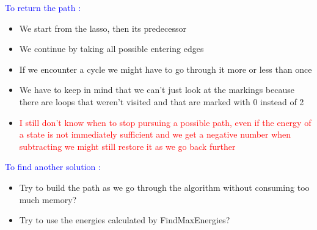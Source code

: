 \documentclass{rapport}
\begin{document}
\vspace{12pt}

\textcolor{blue}{To return the path :}\\
\begin{itemize}
    \item We start from the lasso, then its predecessor
    \item We continue by taking all possible entering edges
    \item If we encounter a cycle we might have to go through it more or less than once
    \item We have to keep in mind that we can't just look at the markings because there are loops that weren't visited and that are marked with 0 instead of 2
    \item \textcolor{red}{I still don’t know when to stop pursuing a possible path, even if the energy of a state is not immediately sufficient and we get a negative number when subtracting we might still restore it as we go back further}
\end{itemize}

\vspace{12pt}

\textcolor{blue}{To find another solution :}\\
\begin{itemize}
    \item Try to build the path as we go through the algorithm without consuming too much memory?
    \item Try to use the energies calculated by FindMaxEnergies?
\end{itemize}
\end{document}

